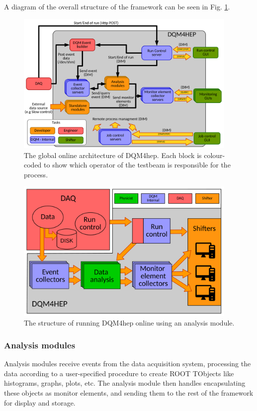 A diagram of the overall structure of the framework can be seen in Fig. \ref{figure:daq/dqm4hep/architecture}.

\begin{figure}[p]
	\centering
	\includegraphics[width=0.95\textwidth]{../Pictures/GlobalArchitectureDiagram.pdf}
	\caption{The global online architecture of \acrshort{DQM4hep}. Each block is colour-coded to show which operator of the testbeam is responsible for the process.}
	\label{figure:daq/dqm4hep/architecture}
\end{figure}

\begin{figure}[p]
	\centering
	\includegraphics[width=0.95\textwidth]{../Pictures/AnalysisModuleArchitecture.pdf}
	\caption{The structure of running \acrshort{DQM4hep} online using an analysis module.}
	\label{figure:daq/dqm4hep/analysis-module}
\end{figure}

\subsubsection{Analysis modules}
Analysis modules receive events from the data acquisition system, processing the data according to a user-specified procedure to create ROOT TObjects like histograms, graphs, plots, etc. The analysis module then handles encapsulating these objects as monitor elements, and sending them to the rest of the framework for display and storage. 

